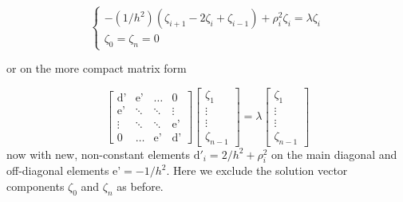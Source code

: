 	\begin{equation}
		\begin{cases}
		-(1/h^2)\left(\zeta_{i+1} -2\zeta_i + \zeta_{i-1}\right) + \rho^2_i\zeta_i = \lambda \zeta_i\\
		\zeta_0 = \zeta_n = 0
		\end{cases}
	\end{equation}
	
	or on the more compact matrix form
	
	\begin{equation}
		\begin{bmatrix}
		\text{d'} & \text{e'} & \hdots & 0\\
		\text{e'} & \ddots & \ddots & \vdots \\
		\vdots & \ddots & \ddots & \text{e'} \\
		0 &\hdots & \text{e'} & \text{d'}
		\end{bmatrix}
		\begin{bmatrix}
		\zeta_1\\ \vdots \\ \vdots \\ \zeta_{n-1}
		\end{bmatrix}
		= 
		\lambda
		\begin{bmatrix}
		\zeta_1\\ \vdots \\ \vdots \\ \zeta_{n-1}
		\end{bmatrix}
	\end{equation}
	now with new, non-constant elements $\text{d}'_i = 2/h^2 + \rho^2_i$ on the main diagonal and  off-diagonal elements $\text{e'} = -1/h^2$. Here we exclude the solution vector components $\zeta_0$ and $\zeta_n$ as before.\\

